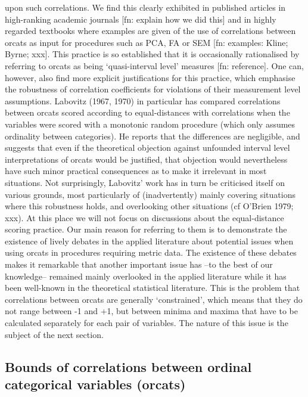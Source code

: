 \documentclass[
  12pt,
]{article}
\theoremstyle{plain}
\theoremstyle{definition}
\theoremstyle{remark}
\begin{document}
upon such correlations. We find this clearly exhibited in published
articles in high-ranking academic journals {[}fn: explain how we did
this{]} and in highly regarded textbooks where examples are given of the
use of correlations between orcats as input for procedures such as PCA,
FA or SEM {[}fn: examples: Kline; Byrne; xxx{]}. This practice is so
established that it is occasionally rationalised by referring to orcats
as being `quasi-interval level' measures {[}fn: reference{]}. One can,
however, also find more explicit justifications for this practice, which
emphasise the robustness of correlation coefficients for violations of
their measurement level assumptions. Labovitz (1967, 1970) in particular
has compared correlations between orcats scored according to
equal-distances with correlations when the variables were scored with a
monotonic random procedure (which only assumes ordinality between
categories). He reports that the differences are negligible, and
suggests that even if the theoretical objection against unfounded
interval level interpretations of orcats would be justified, that
objection would nevertheless have such minor practical consequences as
to make it irrelevant in most situations. Not surprisingly, Labovitz'
work has in turn be criticised itself on various grounds, most
particularly of (inadvertently) mainly covering situations where this
robustness holds, and overlooking other situations (cf O'Brien 1979;
xxx). At this place we will not focus on discussions about the
equal-distance scoring practice. Our main reason for referring to them
is to demonstrate the existence of lively debates in the applied
literature about potential issues when using orcats in procedures
requiring metric data. The existence of these debates makes it
remarkable that another important issue has --to the best of our
knowledge-- remained mainly overlooked in the applied literature while
it has been well-known in the theoretical statistical literature. This
is the problem that correlations between orcats are generally
`constrained', which means that they do not range between -1 and +1, but
between minima and maxima that have to be calculated separately for each
pair of variables. The nature of this issue is the subject of the next
section.

\subsection{Bounds of correlations between ordinal categorical variables
(orcats)}\label{bounds-of-correlations-between-ordinal-categorical-variables-orcats}
\end{document}
